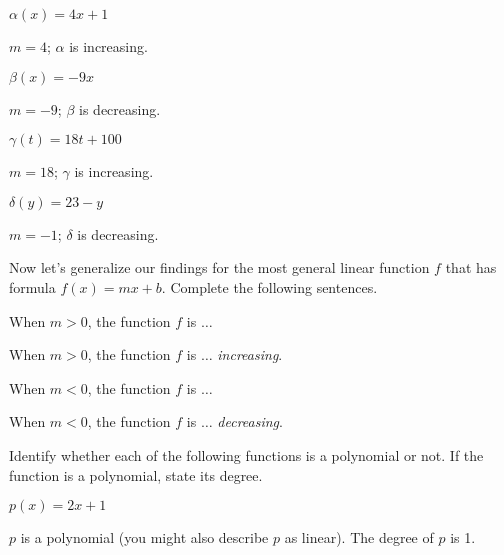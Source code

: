 \begin{exercises}
\begin{problem}
\begin{multicols}{4}
\begin{subproblem}
		$\alpha(x)=4x+1$
		\begin{shortsolution}
			$m=4$; $\alpha$ is increasing.
		\end{shortsolution}
	\end{subproblem}
	\begin{subproblem}
		$\beta(x)=-9x$
		\begin{shortsolution}
			$m=-9$; $\beta$ is decreasing.
		\end{shortsolution}
	\end{subproblem}
	\begin{subproblem}
		$\gamma(t)=18t+100$
		\begin{shortsolution}
			$m=18$; $\gamma$ is increasing.
		\end{shortsolution}
	\end{subproblem}
	\begin{subproblem}
		$\delta(y)=23-y$
		\begin{shortsolution}
			$m=-1$; $\delta$ is decreasing.
		\end{shortsolution}
	\end{subproblem}
\end{multicols}
Now let's generalize our findings for the most general linear function $f$
that has formula $f(x)=mx+b$. Complete the following sentences.
\begin{subproblem}
	When $m>0$, the function $f$ is $\ldots$
	\begin{shortsolution}
		When $m>0$, the function $f$ is $\ldots$  \emph{increasing}.
	\end{shortsolution}
\end{subproblem}
\begin{subproblem}
	When $m<0$, the function $f$ is $\ldots$
	\begin{shortsolution}
		When $m<0$, the function $f$ is $\ldots$  \emph{decreasing}.
	\end{shortsolution}
\end{subproblem}
\end{problem}
\begin{problem}
Identify whether each of the following functions is a polynomial or not.
If the function is a polynomial, state its degree.
\begin{multicols}{3}
	\begin{subproblem}
		$p(x)=2x+1$
		\begin{shortsolution}
			$p$ is a polynomial (you might also describe $p$ as linear). The degree of $p$ is 1.

\end{shortsolution}
\end{subproblem}
\end{multicols}
\end{problem}
\end{exercises}
